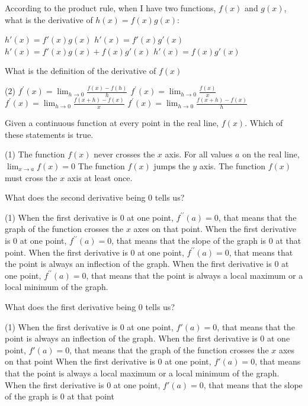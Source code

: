 \documentclass[12pt, noquestionbreak, flushbottom, customfontpath=../Fonts/]{../skrexam}  %
\begin{document}
\begin{questions}

	\question According to the product rule, when I have two functions, $f(x)$ and $g(x)$, what is the derivative of $h(x) = f(x) g(x)$:
	\begin{choices}
		\choice $h'(x) = f'(x) g(x)$
		\choice $h'(x) = f'(x) g '(x)$
		\choice\CorrectChoice $h'(x) = f'(x) g(x)+ f(x) g '(x)$
		\choice $h'(x) = f(x) g '(x)$
	\end{choices}

\question What is the definition of the derivative of $f(x)$
 	\begin{choices}(2)
	\choice $\displaystyle f^\prime(x) = \lim_{h \to 0} \frac{f(x) - f(h)}{h}$
	\choice $\displaystyle f^\prime(x) = \lim_{h \to 0} \frac{f(x)}{x}$
	\choice $\displaystyle f^\prime(x) = \lim_{h \to 0} \frac{f(x+h)-f(x)}{x}$	
 	\choice\CorrectChoice $\displaystyle f^\prime(x) = \lim_{h \to 0} \frac{f(x+h)-f(x)}{h}$
 	\end{choices}

	\question Given a continuous function at every point in the real line, $f(x)$. Which of these statements is true. 
	\begin{choices}(1)
		\choice The function $f(x)$ never crosses the $x$ axis.
		\choice\CorrectChoice For all values $a$ on the real line, $ \lim_{x \to a}f(x)  = 0$
		\choice The function $f(x)$ jumps the $y$ axis.
		\choice The function $f(x)$ must cross the $x$ axis at least once.
	\end{choices}
	

	
	\question What does the second derivative being 0 tells us?
	\begin{choices}(1)
		\choice When the first derivative is $0$ at one point, $f^{\prime \prime}(a) = 0$, that means that the graph of the function crosses the $x$ axes on that point.
		\choice When the first derivative is $0$ at one point, $f^{\prime \prime}(a) = 0$, that means that the slope of the graph is $0$ at that point.
		\choice\CorrectChoice When the first derivative is $0$ at one point, $f^{\prime \prime}(a) = 0$, that means that the point is always an inflection of the graph.
		\choice When the first derivative is $0$ at one point, $f^{\prime \prime}(a) = 0$, that means that the point is always a local maximum or a local minimum of the graph.
	\end{choices}

	\question What does the first derivative being 0 tells us?
	\begin{choices}(1)
		\choice When the first derivative is $0$ at one point, $f'(a) = 0$, that means that the point is always an inflection of the graph.
		\choice When the first derivative is $0$ at one point, $f'(a) = 0$, that means that the graph of the function crosses the $x$ axes on that point
		\choice When the first derivative is $0$ at one point, $f'(a) = 0$, that means that the point is always a local maximum or a local minimum of the graph.
		\choice\CorrectChoice When the first derivative is $0$ at one point, $f'(a) = 0$, that means that the slope of the graph is $0$ at that point
	\end{choices}


\end{questions}
\end{document}

